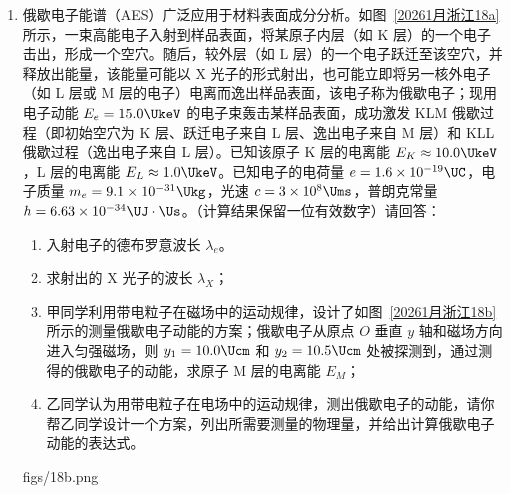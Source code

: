 \documentclass[\gkver]{gaokaozhenti}
\begin{document}
\begin{enumerate}
{或者 $t_{1}+\frac{T}{2}+T<t<t_{1}+t_{2}+\frac{T}{2}+T$，……

综上分析可知 $t$ 应满足 $t_{1}+n\frac{T}{2}<t<t_{1}+t_{2}+n\frac{T}{2}$

则滑块 a 能从 $NQ$ 之间滑出时 $L$ 的范围为

$[0.2\pi + n(0.4\pi + 0.2)]\Um < L < [0.2\pi + 0.2 + n(0.4\pi + 0.2)]\Um$，（$n = 0,1,2,3,4\cdots\cdots$）
}

\item
俄歇电子能谱（AES）广泛应用于材料表面成分分析。如图~\ref{20261月浙江18a} 所示，一束高能电子入射到样品表面，将某原子内层（如 K 层）的一个电子击出，形成一个空穴。随后，较外层（如 L 层）的一个电子跃迁至该空穴，并释放出能量，该能量可能以 X 光子的形式射出，也可能立即将另一核外电子（如 L 层或 M 层的电子）电离而逸出样品表面，该电子称为俄歇电子；现用电子动能 $E_{e} = 15.0\UkeV$ 的电子束轰击某样品表面，成功激发 KLM 俄歇过程（即初始空穴为 K 层、跃迁电子来自 L 层、逸出电子来自 M 层）和 KLL 俄歇过程（逸出电子来自 L 层）。已知该原子 K 层的电离能 $E_{K} \approx 10.0\UkeV$，L 层的电离能 $E_{L} \approx 1.0\UkeV$。已知电子的电荷量 $e = 1.6\times10^{-19}\UC$，电子质量 $m_{e} = 9.1\times10^{-31}\Ukg$，光速 $c = 3\times10^{8}\Ums$，普朗克常量 $h = 6.63\times10^{-34}\UJ\cdot\Us$。（计算结果保留一位有效数字）请回答：
\begin{enumerate}
	\item
	入射电子的德布罗意波长 $\lambda_{e}$。
	\item
	求射出的 X 光子的波长 $\lambda_{X}$；
	\item
	甲同学利用带电粒子在磁场中的运动规律，设计了如图~\ref{20261月浙江18b} 所示的测量俄歇电子动能的方案；俄歇电子从原点 $O$ 垂直 $y$ 轴和磁场方向进入匀强磁场，则 $y_{1} = 10.0\Ucm$ 和 $y_{2} = 10.5\Ucm$ 处被探测到，通过测得的俄歇电子的动能，求原子 M 层的电离能 $E_{M}$；
	\item
	乙同学认为用带电粒子在电场中的运动规律，测出俄歇电子的动能，请你帮乙同学设计一个方案，列出所需要测量的物理量，并给出计算俄歇电子动能的表达式。
\end{enumerate}
{figs/18b.png}
\end{enumerate}
\end{document}
